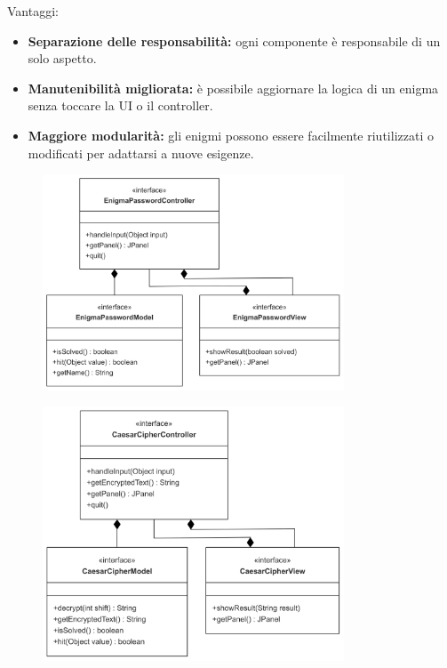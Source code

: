 \documentclass[a4paper,12pt]{report}
\begin{document}
Vantaggi:
\begin{itemize}
	\item \textbf{Separazione delle responsabilità:} ogni componente è responsabile di un solo aspetto. 
	\item \textbf{Manutenibilità migliorata:} è possibile aggiornare la logica di un enigma senza toccare la UI o il controller.
	\item \textbf{Maggiore modularità:} gli enigmi possono essere facilmente riutilizzati o modificati per adattarsi a nuove esigenze.
\end{itemize}
\begin{figure}[h]
    \centering
    \includegraphics[width=0.8\textwidth]{img/enigmaPassword.png}
    \label{img:enigmaPassword}
\end{figure}
\begin{figure}[h]
    \centering
    \includegraphics[width=0.8\textwidth]{img/caesarCipher.png}
    \label{img:caesarCipher}
\end{figure}
%
\end{document}
